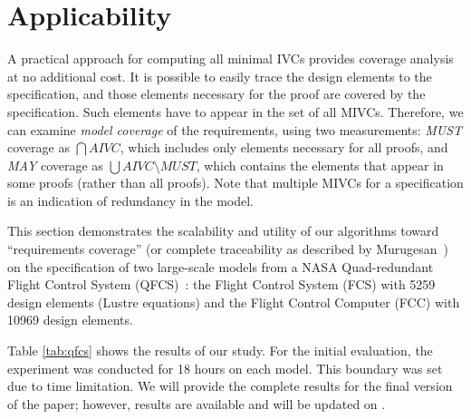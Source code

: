 \section{Applicability}

\label{sec:qfc}

A practical approach for computing all minimal IVCs provides coverage analysis at no additional cost. 
It is possible to easily trace the design elements to the specification, and those elements necessary for the proof are covered by the specification. Such elements have to appear in the set of all MIVCs. Therefore, we can examine {\em model coverage} of the requirements, using two measurements: {\em MUST} coverage as $\bigcap AIVC$, which includes only elements necessary for all proofs, and {\em MAY} coverage as $\bigcup AIVC \setminus MUST$, which contains the elements that appear in some proofs (rather than all proofs). Note that multiple MIVCs for a specification is an indication of redundancy in the model.

This section demonstrates the scalability and utility of our algorithms toward ``requirements coverage'' 
(or complete traceability as described by Murugesan~\cite{Murugesan16:renext}) 
on the specification of two large-scale models from a NASA Quad-redundant Flight Control System (QFCS)~\cite{NFM2015:backes}: the Flight Control System (FCS) with 5259 design elements (Lustre equations) and the Flight Control Computer (FCC) with 10969 design elements.

Table \ref{tab:qfcs} shows the results of our study. For the initial evaluation, the experiment was conducted for 18 hours on each model. This boundary was set due to time limitation. We will provide the complete results for the final version of the paper; however, results are available and will be updated on \cite{expr}.


\iffalse
For each model. when the \aivcalg\ did not terminate before 4 hours, its runtime is shown with incomplete. \ela{we can explain a bit the numbers and table here, then get to coverage}

As mentioned in Section~\ref{sec:intro}, proof-based coverage analysis is one important application of all minimal IVCs. The goal of a
coverage metric is usually to assign a numeric score that de-
scribes how well properties cover the design. The majority of
the work on coverage metrics has focused on mutations, which
are “atomic” changes to the design, where the set of possible
mutations depends on the notation that is used. For large models, mutation-based coverage is quite inefficient. Having all minimal IVCs, we can easily formalize a family of proof-based metrics. For example, owe could define two distinct coverage metrics as follows:
\ela{choose two metric that I can calculate: we could choose must and may since you also talk about them in the introduction}
\fi

